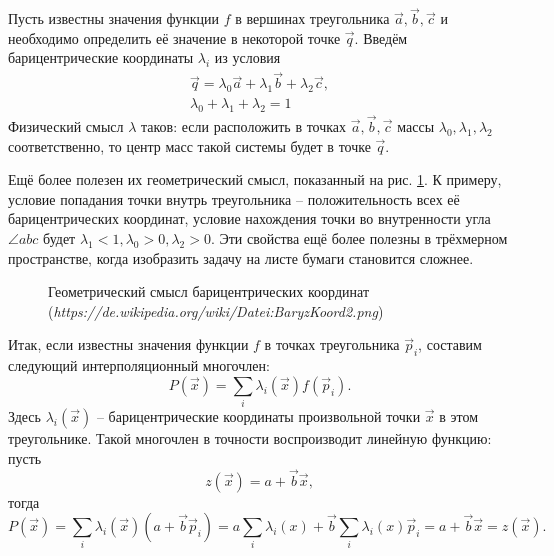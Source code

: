 Пусть известны значения функции $f$ в вершинах треугольника $\vec{a}, \vec{b}, \vec{c}$ и необходимо определить её значение в некоторой точке $\vec{q}$. Введём барицентрические координаты $\lambda_i$ из условия 
\begin{eqnarray}
\vec{q} = \lambda_0 \vec{a} + \lambda_1 \vec{b} + \lambda_2 \vec{c}, \\
\lambda_0 + \lambda_1 + \lambda_2  = 1
\end{eqnarray}
Физический смысл $\lambda$ таков: если расположить в точках $\vec{a}, \vec{b}, \vec{c}$ массы $\lambda_0, \lambda_1, \lambda_2$ соответственно, то центр масс такой системы будет в точке $\vec{q}$. 

Ещё более полезен их геометрический смысл, показанный на рис. \ref{pic:barycentric}. К примеру, условие попадания точки внутрь треугольника -- положительность всех её барицентрических координат, условие нахождения точки во внутренности угла $\angle a b c$ будет $\lambda_1 < 1, \lambda_0 > 0, \lambda_2 > 0$. Эти свойства ещё более полезны в трёхмерном пространстве, когда изобразить задачу на листе бумаги становится сложнее.

\begin{figure}[H]
	\caption{Геометрический смысл барицентрических координат (\textit{https://de.wikipedia.org/wiki/Datei:BaryzKoord2.png})}
	\label{pic:barycentric}
\end{figure}

Итак, если известны значения функции $f$ в точках треугольника $\vec{p}_i$, составим следующий интерполяционный многочлен:
\begin{equation}
P(\vec{x}) = \sum_{i} \lambda_i(\vec{x}) f(\vec{p}_i).
\end{equation}
Здесь $\lambda_i(\vec{x})$ -- барицентрические координаты произвольной точки $\vec{x}$ в этом треугольнике. Такой многочлен в точности воспроизводит линейную функцию: пусть
\begin{equation}
z(\vec{x}) = a + \vec{b} \vec{x},
\end{equation}
тогда
\begin{equation}
P(\vec{x}) = \sum_{i} \lambda_i({\vec{x}}) (a + \vec{b} \vec{p}_i) = a \sum_{i} \lambda_i(x) + \vec{b} \sum_{i} \lambda_i(x) \vec{p}_i = a + \vec{b} \vec{x} = z(\vec{x}).
\end{equation}

